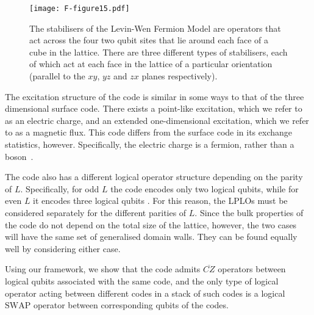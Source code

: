 \documentclass[pra,twocolumn,a4paper,nofootinbib]{revtex4-1}
\begin{document}
\begin{figure}
\centering
\texttt{[image: F-figure15.pdf]}
\caption{The stabilisers of the Levin-Wen Fermion Model are operators that act across the four two qubit sites that lie around each face of a cube in the lattice. There are three different types of stabilisers, each of which act at each face in the lattice of a particular orientation (parallel to the $xy$, $yz$ and $zx$ planes respectively). \label{fig:LWStab}}
\end{figure}

The excitation structure of the code is similar in some ways to that of the three dimensional surface code.  There exists a point-like excitation, which we refer to as an electric charge, and an extended one-dimensional excitation, which we refer to as a magnetic flux. This code differs from the surface code in its exchange statistics, however. Specifically, the electric charge is a fermion, rather than a boson~\cite{LW}. 

The code also has a different logical operator structure depending on the parity of $L$. Specifically, for odd $L$ the code encodes only two logical qubits, while for even $L$ it encodes three logical qubits \cite{Haah}. For this reason, the LPLOs must be considered separately for the different parities of $L$. Since the bulk properties of the code do not depend on the total size of the lattice, however, the two cases will have the same set of generalised domain walls.  They can be found equally well by considering either case.    

Using our framework, we show that the code admits $\overline{CZ}$ operators between logical qubits associated with the same code, and the only type of logical operator acting between different codes in a stack of such codes is a logical $\text{SWAP}$ operator between corresponding qubits of the codes. 
\end{document}
